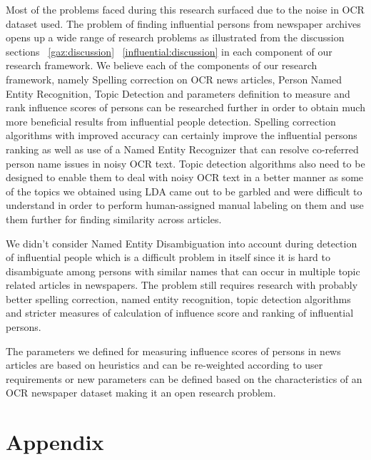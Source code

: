 \documentclass[letterpaper,11pt]{report}
\begin{document}
Most of the problems faced during this research surfaced due to the noise in OCR dataset used. The problem of finding influential persons from newspaper archives opens up a wide range of research problems as illustrated from the discussion sections ~\ref{gaz:discussion} ~\ref{influential:discussion} in each component of our research framework. 
We believe each of the components of our research framework, namely Spelling correction on OCR news articles, Person Named Entity Recognition, Topic Detection and parameters definition to measure and rank influence scores of persons can be researched further in order to obtain much more beneficial results from influential people detection.
Spelling correction algorithms with improved accuracy can certainly improve the influential persons ranking as well as use of a Named Entity Recognizer that can resolve co-referred person name issues in noisy OCR text.
Topic detection algorithms also need to be designed to enable them to deal with noisy OCR text in a better manner as some of the topics we obtained using LDA came out to be garbled and were difficult to understand in order to perform human-assigned manual labeling on them and use them further for finding similarity across articles.

We didn't consider Named Entity Disambiguation into account during detection of influential people which is a difficult problem in itself since it is hard to disambiguate among persons with similar names that can occur in multiple topic related articles in newspapers. The problem still requires research with probably better spelling correction, named entity recognition, topic detection algorithms and stricter measures of calculation of influence score and ranking of influential persons.

 The parameters we defined for measuring influence scores of persons in news articles are based on heuristics and can be re-weighted according to user requirements or new parameters can be defined based on the characteristics of an OCR newspaper dataset making it an open research problem.
  



%

%
%


\chapter*{Appendix}\label{chapter:appendix} 
\end{document}
